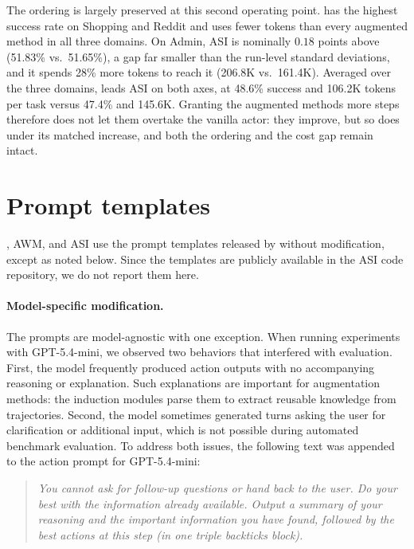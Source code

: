 The ordering is largely preserved at this second operating point.
\budgetactor{} has the highest success rate on Shopping and Reddit and uses fewer tokens than every augmented method in all three domains.
On Admin, ASI is nominally $0.18$ points above \budgetactor{} (51.83\% vs.\ 51.65\%), a gap far smaller than the run-level standard deviations, and it spends 28\% more tokens to reach it (206.8K vs.\ 161.4K).
Averaged over the three domains, \budgetactor{} leads ASI on both axes, at 48.6\% success and 106.2K tokens per task versus 47.4\% and 145.6K.
Granting the augmented methods more steps therefore does not let them overtake the vanilla actor: they improve, but so does \budgetactor{} under its matched increase, and both the ordering and the cost gap remain intact.


\section{Prompt templates}
\label{app:prompts}

\budgetactor{}, AWM, and ASI use the prompt templates released by \citet{wang-etal-2025-asi} without modification, except as noted below.
Since the templates are publicly available in the ASI code repository, we do not report them here.

\paragraph{Model-specific modification.}
The prompts are model-agnostic with one exception.
When running experiments with GPT-5.4-mini, we observed two behaviors that interfered with evaluation.
First, the model frequently produced action outputs with no accompanying reasoning or explanation.
Such explanations are important for augmentation methods: the induction modules parse them to extract reusable knowledge from trajectories.
Second, the model sometimes generated turns asking the user for clarification or additional input, which is not possible during automated benchmark evaluation.
% 
To address both issues, the following text was appended to the action prompt for GPT-5.4-mini:

\begin{quote}
\itshape
You cannot ask for follow-up questions or hand back to the user.
Do your best with the information already available.
Output a summary of your reasoning and the important information you have found, followed by the best actions at this step (in one triple backticks block).
\end{quote}

